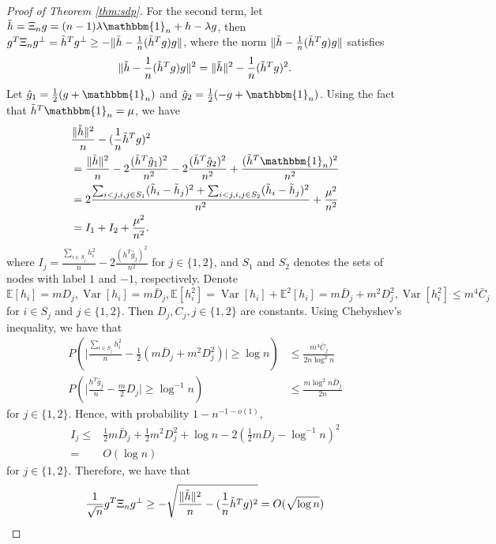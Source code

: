 \documentclass[conference]{IEEEtran}
\DeclarePairedDelimiter\norm{\lVert}{\rVert}
\DeclareMathOperator{\Var}{Var}
\begin{document}
\begin{proof}[Proof of Theorem \ref{thm:sdp}]
	For the second term, let $\tilde{h}=\Xi_n g
	=(n-1)\lambda\mathbbm{1}_n+h-\lambda g$, then
	$g^T \Xi_n g^{\perp} = \tilde{h}^T g^{\perp} \geq -\norm{\tilde{h}-\frac{1}{n}(\tilde{h}^Tg)g}$, where the  norm $\norm{\tilde{h}-\frac{1}{n}(\tilde{h}^Tg)g}$ satisfies
	\begin{align*}
		\norm{\tilde{h}-\frac{1}{n}(\tilde{h}^Tg)g}^2
		=\norm{\tilde{h}}^2 - \frac{1}{n}(\tilde{h}^Tg)^2.
	\end{align*}
	Let $\hat{g}_1 = \frac{1}{2}(g + \mathbbm{1}_n)$ and $\hat{g}_2 = \frac{1}{2}(-g +\mathbbm{1}_n)$.
	Using the fact that $\tilde{h}^T\mathbbm{1}_n=\mu$, we have 
	\begin{align*} 
		&\frac{\norm{\tilde{h}}^2}{n} - (\frac{1}{n}\tilde{h}^Tg)^2\\
		&=\frac{\norm{\tilde{h}}^2}{n} - 2\frac{(\tilde{h}^T \hat{g}_1)^2}{n^2} - 2\frac{(\tilde{h}^T \hat{g}_2)^2}{n^2} + \frac{(\tilde{h}^T\mathbbm{1}_n)^2}{n^2} \\
		&=2\frac{ \sum_{i<j,i,j\in S_1} (\tilde{h}_i - \tilde{h}_j)^2 + \sum_{i<j,i,j\in S_2} (\tilde{h}_i - \tilde{h}_j)^2 }{n^2}+ \frac{\mu^2}{n^2}\\
		& = I_1 + I_2 + \frac{\mu^2}{n^2}.
	\end{align*}
	where $I_j=\frac{\sum_{i\in S_j} h_i^2}{n} - 2\frac{(h^T \hat{g}_j)^2}{n^2}$ for $j\in\{1,2\}$,  and $S_1$ and $S_2$ denotes the sets of nodes with label $1$ and
	$-1$, respectively. Denote $\mathbb{E}[h_i]=m D_j, \Var[h_i]=m \bar{D}_j, \mathbb{E}[h_i^2]=\Var[h_i]+\mathbb{E}^2[h_i]=m \bar{D}_j+m^2 D^2_j, \Var[h_i^2] \leq m^4 \bar{C}_j$ for $i\in S_j$ and $j\in\{1,2\}$. Then
	$D_j, C_j,j\in\{1,2\}$ are constants.
	Using Chebyshev's inequality, we have that
	\begin{align*}
		P(\Big| \frac{\sum_{i\in S_j} h_i^2}{n} - \frac{1}{2}(m \bar{D}_j + m^2D_j^2) \Big| \geq \log n) & \leq \frac{m^4 \bar{C}_j}{2n\log^2 n} \\
		P(\Big| \frac{h^T \hat{g}_j}{n} - \frac{m}{2}D_j\Big| \geq \log^{-1} n) & \leq \frac{m \log^{2} n\bar{D}_j}{2n}
	\end{align*}
	for $j\in\{1,2\}$. Hence, with probability $1-n^{-1-o(1)}$, 
	\begin{align*}
		I_j \leq& \frac{1}{2}m\bar{D}_j + \frac{1}{2}m^2 D_j^2 + \log n - 2(\frac{1}{2}m D_j - \log^{-1} n)^2 \\
		=& O(\log n)
	\end{align*}
	for $j\in\{1,2\}$.
	Therefore, we have that
	$$
	\frac{1}{\sqrt{n}} g^T \Xi_n g^{\perp} \geq -\sqrt{\frac{\norm{\tilde{h}}^2}{n} - (\frac{1}{n}\tilde{h}^Tg)^2} = O(\sqrt{\log n})
	$$
	

\end{proof}
\end{document}
